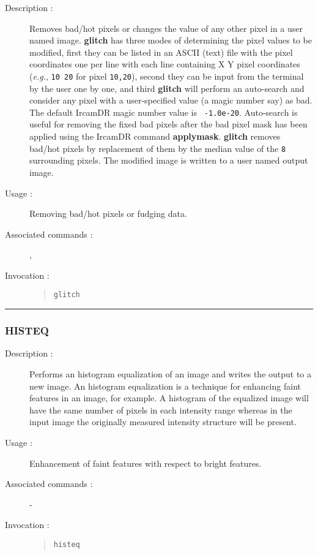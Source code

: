 \begin{description}

\item[Description :] Removes bad/hot pixels or changes the value of any
other pixel in a user named image.  {\bf glitch} has three modes of
determining the pixel values to be modified, first they can be listed
in an ASCII (text) file with the pixel coordinates one per line with
each line containing X Y pixel coordinates (\emph{e.g.}, {\tt 10 20}
for pixel {\tt 10,20}), second they can be input from the terminal by
the user one by one, and third {\bf glitch} will perform an auto-search
and consider any pixel with a user-specified value (a magic number say)
as bad.  The default {\sc IrcamDR} magic number value is {\tt
-1.0e-20}.  Auto-search is useful for removing the fixed bad pixels
after the bad pixel mask has been applied using the {\sc IrcamDR}
command {\bf applymask}.  {\bf glitch} removes bad/hot pixels by
replacement of them by the median value of the {\tt 8} surrounding
pixels.  The modified image is written to a user named output image.

\item[Usage :] Removing bad/hot pixels or fudging data.
\item[Associated commands :] {\tt {}},
{\tt {}}
\item[Invocation :]

\begin{quote}{\tt  glitch }\end{quote}

\end{description}

\hrule
\subsubsection*{\label{HISTEQ}HISTEQ}

\begin{description}

\item[Description :] Performs an histogram equalization of an image and
writes the output to a new image.  An histogram equalization is a
technique for enhancing faint features in an image, for example.  A
histogram of the equalized image will have the same number of pixels in
each intensity range whereas in the input image the originally measured
intensity structure will be present.

\item[Usage :] Enhancement of faint features with respect to bright features.
\item[Associated commands :] -
\item[Invocation :]

\begin{quote}{\tt  histeq }\end{quote}

\end{description}

